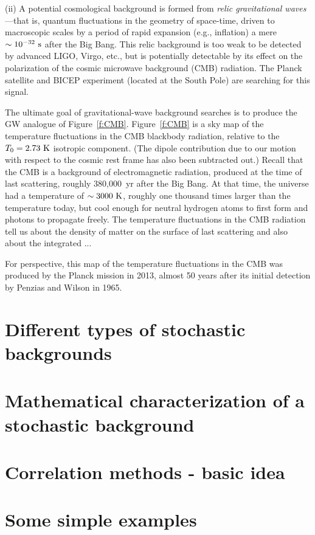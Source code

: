 \documentclass[11pt]{article}
\numberwithin{equation}{section}
\begin{document}
{(ii) A potential cosmological background is formed 
from {\em relic gravitational waves}---that is, 
quantum fluctuations in the geometry of space-time,
driven to macroscopic scales 
by a period of rapid expansion (e.g., inflation) 
a mere $\sim 10^{-32}~{\rm s}$ after the Big Bang.
This relic background is too weak to be detected by 
advanced LIGO, Virgo, etc.,
but is potentially detectable by its effect on the 
polarization of the cosmic microwave background (CMB)
radiation.
The Planck satellite and BICEP experiment (located
at the South Pole) are searching for this signal.

The ultimate goal of gravitational-wave background
searches is to produce the GW analogue of Figure~\ref{f:CMB}.
Figure~\ref{f:CMB} is a sky map of the temperature 
fluctuations in the CMB blackbody radiation, relative 
to the $T_0 = 2.73~{\rm K}$ isotropic component.
(The dipole contribution due to our motion with respect 
to the cosmic rest frame has also been subtracted out.)
Recall that the CMB is a background of electromagnetic
radiation, produced at the time of last scattering,
roughly 380,000~yr after the Big Bang.
At that time, the universe had a temperature of 
$\sim 3000~{\rm K}$, roughly one thousand times larger 
than the temperature today, but cool enough for 
neutral hydrogen atoms to first form and photons to 
propagate freely.
The temperature fluctuations in the CMB radiation tell
us about the density of matter on the surface of last 
scattering and also about the integrated ...

For perspective, this map of the temperature fluctuations 
in the CMB was produced by the Planck mission in 2013,
almost 50 years after its initial detection by Penzias
and Wilson in 1965.

\section{Different types of stochastic backgrounds}

\section{Mathematical characterization of a stochastic background}


\section{Correlation methods - basic idea}

\section{Some simple examples}

}
\end{document}
